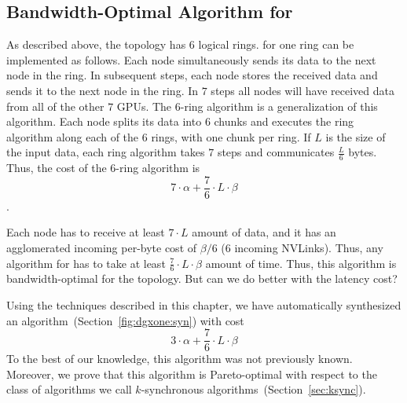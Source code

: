 
\subsection{Bandwidth-Optimal Algorithm for \dgxone}
\label{sec:motivation:bw-optimal}
As described above, the \dgxone topology has $6$ logical rings.
\allgather for one ring can be implemented as follows. Each node
simultaneously sends its data to the next node in the ring. In
subsequent steps, each node stores the received data and sends it to
the next node in the ring. In $7$ steps all nodes will have received
data from all of the other $7$ GPUs. The $6$-ring algorithm is a
generalization of this algorithm. Each node splits its data into $6$
chunks and executes the ring algorithm along each of the $6$ rings,
with one chunk per ring. If $L$ is the size of the input data, each
ring algorithm takes $7$ steps and communicates $\frac{L}{6}$ bytes.
Thus, the cost of the $6$-ring algorithm is
$$7\cdot \alpha + \frac{7}{6}\cdot L \cdot \beta$$.

Each node has to receive at least $7 \cdot L$ amount of data, and it
has an agglomerated incoming per-byte cost of $\beta/6$ (6 incoming
NVLinks). Thus, any algorithm for \allgather has to take at least
$\frac{7}{6}\cdot L \cdot \beta$ amount of time. Thus, this algorithm
is bandwidth-optimal for the \dgxone topology. But can we do better
with the latency cost?

Using the techniques described in this chapter, we have automatically
synthesized an algorithm~(Section~\ref{fig:dgxone:syn}) with cost
$$3\cdot \alpha + \frac{7}{6}\cdot L \cdot \beta$$ To the best of our
knowledge, this algorithm was not previously known. Moreover, we prove
that this algorithm is Pareto-optimal with respect to the class of
algorithms we call $k$-synchronous
algorithms~(Section~\ref{sec:ksync}).

